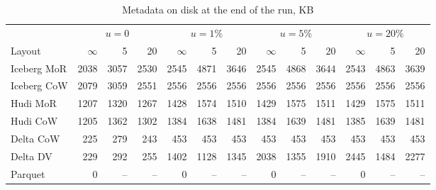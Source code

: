 \begin{table}[!t]\centering
\caption{Metadata on disk at the end of the run, KB}\label{tab:a-meta}
\footnotesize
\begin{tabular}{@{}lrrrrrrrrrrrr@{}}\toprule
 & \multicolumn{3}{c}{$u=0$} & \multicolumn{3}{c}{$u=1\%$} & \multicolumn{3}{c}{$u=5\%$} & \multicolumn{3}{c}{$u=20\%$}\\
\cmidrule(lr){2-4}\cmidrule(lr){5-7}\cmidrule(lr){8-10}\cmidrule(lr){11-13}
Layout & $\infty$ & 5 & 20 & $\infty$ & 5 & 20 & $\infty$ & 5 & 20 & $\infty$ & 5 & 20\\\midrule
Iceberg MoR & 2038 & 3057 & 2530 & 2545 & 4871 & 3646 & 2545 & 4868 & 3644 & 2543 & 4863 & 3639\\
Iceberg CoW & 2079 & 3059 & 2551 & 2556 & 2556 & 2556 & 2556 & 2556 & 2556 & 2556 & 2556 & 2556\\
Hudi MoR & 1207 & 1320 & 1267 & 1428 & 1574 & 1510 & 1429 & 1575 & 1511 & 1429 & 1575 & 1511\\
Hudi CoW & 1205 & 1362 & 1302 & 1384 & 1638 & 1481 & 1384 & 1639 & 1481 & 1385 & 1639 & 1481\\
Delta CoW & 225 & 279 & 243 & 453 & 453 & 453 & 453 & 453 & 453 & 453 & 453 & 453\\
Delta DV & 229 & 292 & 255 & 1402 & 1128 & 1345 & 2038 & 1355 & 1910 & 2445 & 1484 & 2277\\
Parquet & 0 & -- & -- & 0 & -- & -- & 0 & -- & -- & 0 & -- & --\\\bottomrule
\end{tabular}
\end{table}

